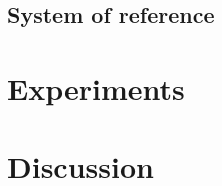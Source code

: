 \subsection*{System of reference}




\section{Experiments\label{section:evaluation-experiments}}

\section{Discussion\label{section:evaluation-discussion}}

